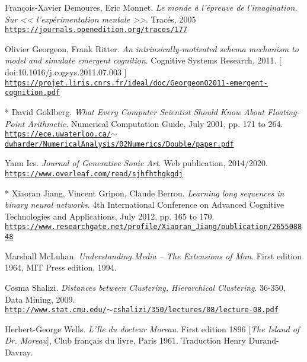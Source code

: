 \begin{thebibliography}{99}
	 François-Xavier Demoures, Eric Monnet. \textit{Le monde à l’épreuve de l’imagination. Sur << l’expérimentation mentale >>}. Tracés, 2005 \\ \href{https://journals.openedition.org/traces/177}{\scriptsize{\texttt{https://journals.openedition.org/traces/177}}} \normalsize{}
	 
	 Olivier Georgeon, Frank Ritter. \textit{An intrinsically-motivated schema mechanism to model and simulate emergent cognition}. 
	 Cognitive Systems Research, 2011. {\scriptsize [ doi:10.1016/j.cogsys.2011.07.003 ]}
	 \\ \href{https://projet.liris.cnrs.fr/ideal/doc/GeorgeonO2011-emergent-cognition.pdf}{\scriptsize{\texttt{https://projet.liris.cnrs.fr/ideal/doc/GeorgeonO2011-emergent-cognition.pdf}}} \normalsize{}
	 
	 * David Goldberg. \textit{What Every Computer Scientist Should Know About Floating-Point Arithmetic}. Numerical Computation Guide, July 2001, pp. 171 to 264.\\ \href{https://ece.uwaterloo.ca/\~dwharder/NumericalAnalysis/02Numerics/Double/paper.pdf}{\scriptsize{\texttt{https://ece.uwaterloo.ca/$\sim$dwharder/NumericalAnalysis/02Numerics/Double/paper.pdf}}} \normalsize{}
	 
	 Yann Ics. \textit{Journal of Generative Sonic Art}. Web publication, 2014/2020.\\ \href{https://www.overleaf.com/read/sjhfhthgkgdj}{\scriptsize{\texttt{https://www.overleaf.com/read/sjhfhthgkgdj}}} \normalsize{}
	
	 * Xiaoran Jiang, Vincent Gripon, Claude Berrou. \textit{Learning long sequences in binary neural networks}. 4th International Conference on Advanced Cognitive Technologies and Applications, July 2012, pp. 165 to 170.\\ \href{https://www.researchgate.net/profile/Xiaoran\_Jiang/publication/265508848\_Learning\_Long\_Sequences\_in\_Binary\_Neural\_Networks/links/54107a6c0cf2f2b29a410d8c.pdf}{\scriptsize{\texttt{https://www.researchgate.net/profile/Xiaoran\_Jiang/publication/265508848}}} \normalsize{}
	 
	Marshall McLuhan. \textit{Understanding Media -- The Extensions of  Man}. First edition 1964, MIT Press edition, 1994.
				 
	 Cosma Shalizi. \textit{Distances between Clustering, Hierarchical Clustering}. 
	 36-350, Data Mining, 2009.\\ \href{http://www.stat.cmu.edu/\~cshalizi/350/lectures/08/lecture-08.pdf}{\scriptsize{\texttt{http://www.stat.cmu.edu/$\sim$cshalizi/350/lectures/08/lecture-08.pdf}}} \normalsize{}
	 
	Herbert-George Wells. \textit{L'Ile du docteur Moreau}. First edition 1896 [\textit{The Island of Dr. Moreau}], Club fran\c{c}ais du livre, Paris 1961. Traduction Henry Durand-Davray. 
		 
\end{thebibliography}